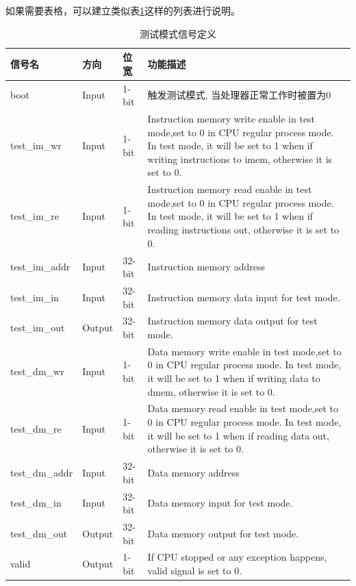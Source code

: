 \documentclass[a4paper]{article}
\begin{document}
如果需要表格，可以建立类似表\ref{tab:signaldef}这样的列表进行说明。

\begin{table}[htp]
\caption{测试模式信号定义}\label{tab:signaldef}
\begin{center}
	\begin{tabular}{|l|l|l|p{6cm}|}
	\hline
	\textbf{信号名} & \textbf{方向} & \textbf{位宽} & \textbf{功能描述}\\ \hline \hline
	boot			& Input 	& 1-bit	& 触发测试模式, 当处理器正常工作时被置为0\\ \hline
	test\_im\_wr 	& Input	& 1-bit	& Instruction memory write enable in test mode,set to 0 in 	
								  CPU regular process mode. In test mode, it will be set to 1 when if writing instructions to imem, otherwise it is set to 0.\\ \hline
	test\_im\_re 	& Input & 1-bit & Instruction memory read enable in test mode,set to 0 in 	
								  CPU regular process mode. In test mode, it will be set to 1 when if reading instructions out, otherwise it is set to 0. \\ \hline
	test\_im\_addr 	& Input & 32-bit& Instruction memory address\\ \hline
	test\_im\_in 	& Input & 32-bit& Instruction memory data input for test mode. \\ \hline
	test\_im\_out 	& Output& 32-bit& Instruction memory data output for test mode. \\ \hline
	test\_dm\_wr 	& Input	& 1-bit	& Data memory write enable in test mode,set to 0 in 	
								  CPU regular process mode. In test mode, it will be set to 1 when if writing data to dmem, otherwise it is set to 0.\\ \hline
	test\_dm\_re 	& Input & 1-bit & Data memory read enable in test mode,set to 0 in 	
								  CPU regular process mode. In test mode, it will be set to 1 when if reading data out, otherwise it is set to 0.\\ \hline
	test\_dm\_addr 	& Input & 32-bit& Data memory address\\ \hline
	test\_dm\_in 	& Input & 32-bit& Data memory input for test mode. \\ \hline
	test\_dm\_out 	& Output& 32-bit& Data memory output for test mode. \\ \hline
	valid			& Output& 1-bit & If CPU stopped or any exception happens, valid signal is set to 0.\\ 
	\hline
	\end{tabular}
\end{center}
\end{table}
\end{document}
